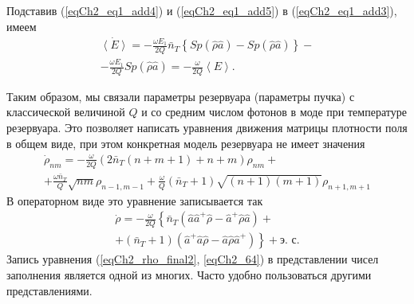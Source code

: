 Подставив (\ref{eqCh2_eq1_add4}) и (\ref{eqCh2_eq1_add5}) в 
(\ref{eqCh2_eq1_add3}), имеем
\begin{eqnarray}
\dot{\left<E\right>} =
- \frac{\omega E_1}{2Q}\bar{n}_T
\left\{Sp\left(\hat{\rho}\hat{a}\right) -
Sp\left(\hat{\rho}\hat{a}\right)\right\} -
\nonumber \\
- \frac{\omega E_1}{2Q}Sp\left(\hat{\rho}\hat{a}\right) = 
- \frac{\omega}{2Q}\left<E\right>.
\label{eqCh2_61}
\end{eqnarray}

Таким образом, мы связали параметры резервуара (параметры
пучка) с классической величиной $Q$ и со средним числом фотонов в моде 
при температуре резервуара. Это позволяет написать уравнения движения
матрицы плотности поля в общем виде, при этом конкретная модель
резервуара не имеет значения 
\begin{eqnarray}
\dot{\rho}_{nm} = - \frac{\omega}{2 Q}
\left(2 \bar{n}_T\left( n + m + 1\right) + n + m \right)\rho_{nm} +
\nonumber \\
+ \frac{\omega \bar{n}_T}{Q}\sqrt{nm}\rho_{n - 1, m - 1} +
\frac{\omega}{Q}\left(\bar{n}_T + 1\right)
\sqrt{\left(n + 1\right)\left(m + 1\right)}
\rho_{n + 1, m + 1}
\label{eqCh2_63}
\end{eqnarray}
В операторном виде это уравнение записывается так
\begin{eqnarray}
\dot{\rho} = - \frac{\omega}{2 Q}
\left\{
\bar{n}_T\left(\hat{a}\hat{a}^{+}\hat{\rho} - 
\hat{a}^{+}\hat{\rho}\hat{a}\right)
\right. +
\nonumber \\
+
\left .
\left(\bar{n}_T + 1\right)\left(\hat{a}^{+}\hat{a}\hat{\rho} - 
\hat{a}\hat{\rho}\hat{a}^{+}\right)
\right\} + \mbox{э. с.}
\label{eqCh2_64}
\end{eqnarray}
Запись уравнения (\ref{eqCh2_rho_final2}, \ref{eqCh2_64}) в
представлении чисел заполнения является одной из многих. Часто удобно
пользоваться другими представлениями.  
